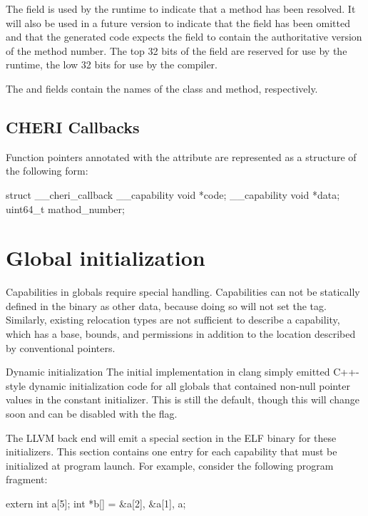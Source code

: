 The  field is used by the runtime to indicate that a method has been resolved.
It will also be used in a future version to indicate that the  field has been omitted and that the generated code expects the  field to contain the authoritative version of the method number.
The top 32 bits of the  field are reserved for use by the runtime, the low 32 bits for use by the compiler.

The  and  fields contain the names of the class and method, respectively.

\subsection{CHERI Callbacks}

Function pointers annotated with the  attribute are represented as a structure of the following form:

\begin{csnippet}
struct __cheri_callback
{
	__capability void *code;
	__capability void *data;
	uint64_t           mathod_number;
}
\end{csnippet}

\section{Global initialization}

Capabilities in globals require special handling.
Capabilities can not be statically defined in the binary as other data, because doing so will not set the tag.
Similarly, existing relocation types are not sufficient to describe a capability, which has a base, bounds, and permissions in addition to the location described by conventional pointers.

\begin{notebox}{Dynamic initialization}
The initial implementation in clang simply emitted C++-style dynamic initialization code for all globals that contained non-null pointer values in the constant initializer.
This is still the default, though this will change soon and can be disabled with the  flag.
\end{notebox}

The LLVM back end will emit a special section in the ELF binary for these initializers.
This section contains one entry for each capability that must be initialized at program launch.
For example, consider the following program fragment:
\begin{csnippet}
extern int a[5];
int *b[] = {&a[2], &a[1], a};
\end{csnippet}

